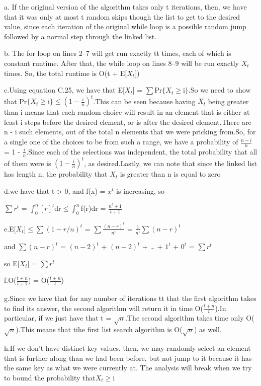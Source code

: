 \documentclass[a4paper, justified]{tufte-handout}
\begin{document}
\begin{solution}
  a. If the original version of the algorithm takes only t iterations, then, we have that it was only at most t random skips though the list to get to the desired value, since each iteration of the original while loop is a possible random jump followed by a normal step through the linked list.

  b. The for loop on lines 2–7 will get run exactly tt times, each of which is constant runtime. After that, the while loop on lines 8–9 will be run exactly $X_t$ times. So, the total runtime is O(t + E[$X_t$])

  c.Using equation C.25, we have that E[$X_t$] = $\sum$Pr$\{$$X_t$$\ge$i$\}$.So we need to show that Pr$\{$$X_t$$\ge$i$\}$$\le$$(1 - \frac{i}{n})^t$.This can be seen because having $X_t$ being greater than i means that each random choice will result in an element that is either at least i steps before the desired element, or is after the desired element.There are n - i such elements, out of the total n elements that we were pricking from.So, for a single one of the choices to be from such a range, we have a probability of $\frac{n - i}{n}$ = 1 - $\frac{i}{n}$.Since each of the selections was independent, the total probability that all of them were is $(1 - \frac{i}{n})^t$, as desired.Lastly, we can note that since the linked list has length n, the probability that $X_t$ is greater than n is equal to zero

      d.we have that t > 0, and f(x) = $x^t$ is increasing, so

    $\sum$$r^t$ = $\int_0^n$$[r]^t$dr$\le$$\int_0^n$f(r)dr = $\frac{n^t + 1}{t + 1}$

        e.E[$X_t$]$\le$$\sum$$(1 - r/n)^t$ = $\sum$$\frac{(n - r)^t}{n^t}$ = $\frac{1}{n^t}$$\sum$$(n - r)^t$

      and $\sum$$(n - r)^t$ = $(n - 2)^t$ + $(n - 2)^t$ + … + $1^t$ + $0^t$ = $\sum$$r^t$

      so E[$X_t$] = $\sum$$r^t$

        f.O($\frac{t + n}{t + 1}$) = O($\frac{t + n}{t}$)

        g.Since we have that for any number of iterations tt that the first algorithm takes to find its answer, the second algorithm will return it in time O($\frac{t + n}{t}$).In particular, if we just have that t = $\sqrt{n}$.The second algorithm takes time only O($\sqrt{n}$).This means that tihe first list search algorithm is
        O($\sqrt{n}$) as well.

        h.If we don't have distinct key values, then, we may randomly select an element that is further along than we had been before, but not jump to it because it has the same key as what we were currently at. The analysis will break when we try to bound the probability that$X_t$$\ge$i
\end{solution}
\end{document}
